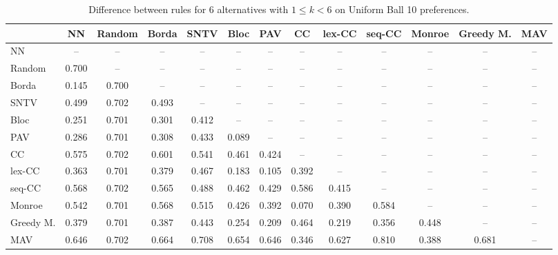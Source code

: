 
\begin{table*}[htbp]
\centering
\begin{tabular}{lcccccccccccc}
\toprule
 & NN & Random & Borda & SNTV & Bloc & PAV & CC & lex-CC & seq-CC & Monroe & Greedy M. & MAV \\
\midrule
NN & -- & -- & -- & -- & -- & -- & -- & -- & -- & -- & -- & -- \\
Random & \cellcolor{blue!70} 0.700 & -- & -- & -- & -- & -- & -- & -- & -- & -- & -- & -- \\
Borda & \cellcolor{blue!14} 0.145 & \cellcolor{blue!70} 0.700 & -- & -- & -- & -- & -- & -- & -- & -- & -- & -- \\
SNTV & \cellcolor{blue!49} 0.499 & \cellcolor{blue!70} 0.702 & \cellcolor{blue!49} 0.493 & -- & -- & -- & -- & -- & -- & -- & -- & -- \\
Bloc & \cellcolor{blue!25} 0.251 & \cellcolor{blue!70} 0.701 & \cellcolor{blue!30} 0.301 & \cellcolor{blue!41} 0.412 & -- & -- & -- & -- & -- & -- & -- & -- \\
PAV & \cellcolor{blue!28} 0.286 & \cellcolor{blue!70} 0.701 & \cellcolor{blue!30} 0.308 & \cellcolor{blue!43} 0.433 & \cellcolor{blue!8} 0.089 & -- & -- & -- & -- & -- & -- & -- \\
CC & \cellcolor{blue!57} 0.575 & \cellcolor{blue!70} 0.702 & \cellcolor{blue!60} 0.601 & \cellcolor{blue!54} 0.541 & \cellcolor{blue!46} 0.461 & \cellcolor{blue!42} 0.424 & -- & -- & -- & -- & -- & -- \\
lex-CC & \cellcolor{blue!36} 0.363 & \cellcolor{blue!70} 0.701 & \cellcolor{blue!37} 0.379 & \cellcolor{blue!46} 0.467 & \cellcolor{blue!18} 0.183 & \cellcolor{blue!10} 0.105 & \cellcolor{blue!39} 0.392 & -- & -- & -- & -- & -- \\
seq-CC & \cellcolor{blue!56} 0.568 & \cellcolor{blue!70} 0.702 & \cellcolor{blue!56} 0.565 & \cellcolor{blue!48} 0.488 & \cellcolor{blue!46} 0.462 & \cellcolor{blue!42} 0.429 & \cellcolor{blue!58} 0.586 & \cellcolor{blue!41} 0.415 & -- & -- & -- & -- \\
Monroe & \cellcolor{blue!54} 0.542 & \cellcolor{blue!70} 0.701 & \cellcolor{blue!56} 0.568 & \cellcolor{blue!51} 0.515 & \cellcolor{blue!42} 0.426 & \cellcolor{blue!39} 0.392 & \cellcolor{blue!7} 0.070 & \cellcolor{blue!39} 0.390 & \cellcolor{blue!58} 0.584 & -- & -- & -- \\
Greedy M. & \cellcolor{blue!37} 0.379 & \cellcolor{blue!70} 0.701 & \cellcolor{blue!38} 0.387 & \cellcolor{blue!44} 0.443 & \cellcolor{blue!25} 0.254 & \cellcolor{blue!20} 0.209 & \cellcolor{blue!46} 0.464 & \cellcolor{blue!21} 0.219 & \cellcolor{blue!35} 0.356 & \cellcolor{blue!44} 0.448 & -- & -- \\
MAV & \cellcolor{blue!64} 0.646 & \cellcolor{blue!70} 0.702 & \cellcolor{blue!66} 0.664 & \cellcolor{blue!70} 0.708 & \cellcolor{blue!65} 0.654 & \cellcolor{blue!64} 0.646 & \cellcolor{blue!34} 0.346 & \cellcolor{blue!62} 0.627 & \cellcolor{blue!81} 0.810 & \cellcolor{blue!38} 0.388 & \cellcolor{blue!68} 0.681 & -- \\
\bottomrule
\end{tabular}

\caption{Difference between rules for 6 alternatives with $1 \leq k < 6$ on Uniform Ball 10 preferences.}
\label{tab:rule_distance_heatmap-m=[6]-pref_dist=euclidean__args__dimensions=10_-_space=uniform_ball}
\end{table*}
    